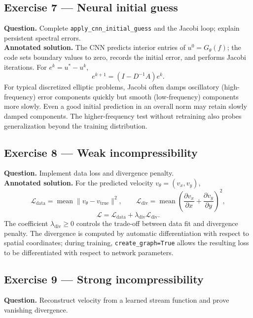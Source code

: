 \documentclass[11pt,a4paper]{article}
\begin{document}
\subsection{Exercise 7 --- Neural initial guess}

\noindent \textbf{Question.} Complete \texttt{apply\_cnn\_initial\_guess}
and the Jacobi loop; explain persistent spectral errors.
\\

\noindent \textbf{Annotated solution.} The CNN predicts interior entries
of $u^0=G_\theta(f)$; the code sets boundary values to zero,
records the initial error, and performs Jacobi iterations.
For $e^k=u^*-u^k$,
\[
e^{k+1}=(I-D^{-1}A)e^k.
\]
For typical discretized elliptic problems, Jacobi often
damps oscillatory (high-frequency) error components quickly
but smooth (low-frequency) components more slowly. Even a
good initial prediction in an overall norm may retain
slowly damped components. The higher-frequency test
without retraining also probes generalization beyond the
training distribution.

\subsection{Exercise 8 --- Weak incompressibility}

\noindent \textbf{Question.} Implement data loss and divergence penalty.
\\

\noindent \textbf{Annotated solution.} For the predicted velocity
$v_\theta=(v_x,v_y)$,
\[
\mathcal L_{\mathrm{data}}
=\operatorname{mean}\|v_\theta-v_{\mathrm{true}}\|^2,\qquad
\mathcal L_{\mathrm{div}}
=\operatorname{mean}\left(
\frac{\partial v_x}{\partial x}
+\frac{\partial v_y}{\partial y}\right)^2,
\]
\[
\mathcal L=\mathcal L_{\mathrm{data}}
+\lambda_{\mathrm{div}}\mathcal L_{\mathrm{div}}.
\]
The coefficient $\lambda_{\mathrm{div}}\geq0$ controls
the trade-off between data fit and divergence penalty.
The divergence is computed by automatic differentiation
with respect to spatial coordinates; during training,
\texttt{create\_graph=True} allows the resulting loss
to be differentiated with respect to network parameters.

\subsection{Exercise 9 --- Strong incompressibility}

\noindent \textbf{Question.} Reconstruct velocity from a learned
stream function and prove vanishing divergence.
\\
\end{document}
